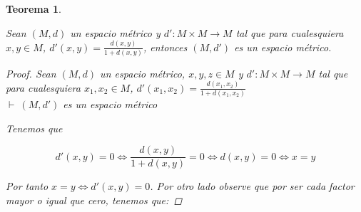 \documentclass[oneside]{book} %
\theoremstyle{Teorema}
\newtheorem{Teorema}[Definicion]{Teorema}
\theoremstyle{Ejemplos}
\theoremstyle{[Obs]}
\renewcommand{\{}{\left\lbrace} %
\renewcommand{\}}{\right\rbrace} %
\newcommand{\pd}{$\vdash\ $} %
\begin{document}
			\begin{Teorema}\label{Teorema: Metrica a partir de otra, fraccion con denominador 1 mas la metrica}\setlength{\parindent}{0em}
				
				Sean $(M, d)$ un espacio métrico y $d' : M \times M \to M$ tal que para cualesquiera $x, y \in M$, $d'(x, y) = \frac{d(x,y)}{1 + d(x, y)}$, entonces $(M, d')$ es un espacio métrico. 

				\begin{proof}
					
					Sean $(M, d)$ un espacio métrico, $x, y, z \in M$ y $d' : M \times M \to M$ tal que para cualesquiera $x_1, x_2 \in M$, $d'(x_1, x_2) = \frac{d(x_1,x_2)}{1 + d(x_1, x_2)}$ \\
					\pd $(M, d')$ es un espacio métrico

					Tenemos que
					
					\[ d'(x, y) = 0 \Leftrightarrow \frac{d(x, y)}{1 + d(x, y)} = 0 \Leftrightarrow d(x, y) = 0 \Leftrightarrow x = y \]

					Por tanto $x = y \Leftrightarrow d'(x, y) = 0$. Por otro lado observe que por ser cada factor mayor o igual que cero, tenemos que: 


\end{proof}
\end{Teorema}
\end{document}
